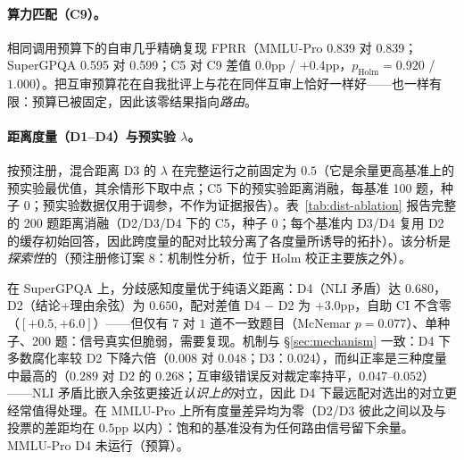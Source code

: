 \documentclass[UTF8,11pt]{ctexart}
\begin{document}
\paragraph{算力匹配（C9）。}
相同调用预算下的自审几乎精确复现 FPRR（MMLU-Pro 0.839 对 0.839；SuperGPQA 0.595 对 0.599；C5 对 C9 差值 $0.0$pp / $+0.4$pp，$p_{\mathrm{Holm}} = 0.920$ / $1.000$）。把互审预算花在自我批评上与花在同伴互审上恰好一样好——也一样有限：预算已被固定，因此该零结果指向\emph{路由}。

\paragraph{距离度量（D1--D4）与预实验 $\lambda$。}
按预注册，混合距离 D3 的 $\lambda$ 在完整运行之前固定为 $0.5$（它是余量更高基准上的预实验最优值，其余情形下取中点；C5 下的预实验距离消融，每基准 100 题，种子 0；预实验数据仅用于调参，不作为证据报告）。表~\ref{tab:dist-ablation} 报告完整的 200 题距离消融（D2/D3/D4 下的 C5，种子 0；每个基准内 D3/D4 复用 D2 的缓存初始回答，因此跨度量的配对比较分离了各度量所诱导的拓扑）。该分析是\emph{探索性}的（预注册修订案 8：机制性分析，位于 Holm 校正主要族之外）。

在 SuperGPQA 上，分歧感知度量优于纯语义距离：D4（NLI 矛盾）达 $0.680$，D2（结论+理由余弦）为 $0.650$，配对差值 D4 $-$ D2 为 $+3.0$pp，自助 CI 不含零（$[+0.5, +6.0]$）——但仅有 $7$ 对 $1$ 道不一致题目（McNemar $p=0.077$）、单种子、200 题：信号真实但脆弱，需要复现。机制与 \S\ref{sec:mechanism} 一致：D4 下多数腐化率较 D2 下降六倍（$0.008$ 对 $0.048$；D3：$0.024$），而纠正率是三种度量中最高的（$0.289$ 对 D2 的 $0.268$；互审级错误反对裁定率持平，$0.047$--$0.052$）——NLI 矛盾比嵌入余弦更接近\emph{认识上的}对立，因此 D4 下最远配对选出的对立更经常值得处理。在 MMLU-Pro 上所有度量差异均为零（D2/D3 彼此之间以及与投票的差距均在 $0.5$pp 以内）：饱和的基准没有为任何路由信号留下余量。MMLU-Pro D4 未运行（预算）。
\end{document}
